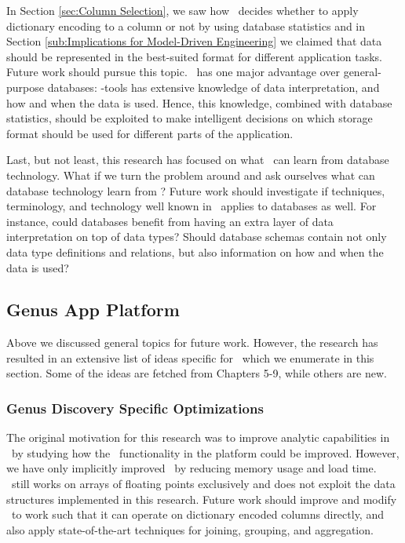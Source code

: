In Section \ref{sec:Column Selection}, we saw how \gap~decides whether to apply dictionary encoding to a column or not by using database statistics and in Section \ref{sub:Implications for Model-Driven Engineering} we claimed that data should be represented in the best-suited format for different application tasks. Future work should pursue this topic. \mde~has one major advantage over general-purpose databases: \mdd-tools has extensive knowledge of data interpretation, and how and when the data is used. Hence, this knowledge, combined with database statistics, should be exploited to make intelligent decisions on which storage format should be used for different parts of the application.

Last, but not least, this research has focused on what \mde~can learn from database technology. What if we turn the problem around and ask ourselves what can database technology learn from \mde? Future work should investigate if techniques, terminology, and technology well known in \mde~applies to databases as well. For instance, could databases benefit from having an extra layer of data interpretation on top of data types? Should database schemas contain not only data type definitions and relations, but also information on how and when the data is used?

\subsection{Genus App Platform}
\label{sub:Genus App Platform}
Above we discussed general topics for future work. However, the research has resulted in an extensive list of ideas specific for \gap~which we enumerate in this section. Some of the ideas are fetched from Chapters 5-9, while others are new.

\subsubsection{Genus Discovery Specific Optimizations}
\label{ssub:Genus Discovery Specific Optimizations}
The original motivation for this research was to improve analytic capabilities in \gap~by studying how the \bd~functionality in the platform could be improved. However, we have only implicitly improved \gd~by reducing memory usage and load time. \gd~still works on arrays of floating points exclusively and does not exploit the data structures implemented in this research. Future work should improve and modify \gd~to work such that it can operate on dictionary encoded columns directly, and also apply state-of-the-art techniques for joining, grouping, and aggregation.


